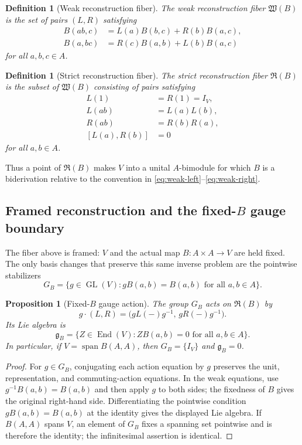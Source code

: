 \documentclass[11pt]{amsart}
\newtheorem{proposition}[theorem]{Proposition}
\newtheorem{definition}[theorem]{Definition}
\newcommand{\Span}{\operatorname{span}}
\newcommand{\Wfib}{\mathfrak W}
\newcommand{\Rfib}{\mathfrak R}
\begin{document}
\begin{definition}[Weak reconstruction fiber]
The weak reconstruction fiber $\Wfib(B)$ is the set of pairs $(L,R)$ satisfying
\begin{align}
B(ab,c)&=L(a)B(b,c)+R(b)B(a,c), \label{eq:weak-left}\\
B(a,bc)&=R(c)B(a,b)+L(b)B(a,c) \label{eq:weak-right}
\end{align}
for all $a,b,c\in A$.
\end{definition}

\begin{definition}[Strict reconstruction fiber]
The strict reconstruction fiber $\Rfib(B)$ is the subset of $\Wfib(B)$ consisting of pairs satisfying
\begin{align}
L(1)&=R(1)=I_V, \label{eq:unit}\\
L(ab)&=L(a)L(b), \label{eq:left-rep}\\
R(ab)&=R(b)R(a), \label{eq:right-rep}\\
[L(a),R(b)]&=0 \label{eq:commuting-actions}
\end{align}
for all $a,b\in A$.
\end{definition}

Thus a point of $\Rfib(B)$ makes $V$ into a unital $A$-bimodule for which $B$ is a biderivation relative to the convention in \eqref{eq:weak-left}--\eqref{eq:weak-right}.

\subsection{Framed reconstruction and the fixed-$B$ gauge boundary}\label{sec:gauge-boundary}
The fiber above is framed: $V$ and the actual map $B:A\times A\to V$ are held fixed.  The only basis changes that preserve this same inverse problem are the pointwise stabilizers
\[
G_B=\{g\in\operatorname{GL}(V):gB(a,b)=B(a,b)\text{ for all }a,b\in A\}.
\]

\begin{proposition}[Fixed-$B$ gauge action]\label{prop:fixed-B-gauge}
The group $G_B$ acts on $\Rfib(B)$ by
\[
g\cdot(L,R)=\bigl(gL(\mathord{-})g^{-1},\,gR(\mathord{-})g^{-1}\bigr).
\]
Its Lie algebra is
\[
\mathfrak g_B=\{Z\in\operatorname{End}(V):ZB(a,b)=0\text{ for all }a,b\in A\}.
\]
In particular, if $V=\Span B(A,A)$, then $G_B=\{I_V\}$ and $\mathfrak g_B=0$.
\end{proposition}

\begin{proof}
For $g\in G_B$, conjugating each action equation by $g$ preserves the unit, representation, and commuting-action equations.  In the weak equations, use $g^{-1}B(a,b)=B(a,b)$ and then apply $g$ to both sides; the fixedness of $B$ gives the original right-hand side.  Differentiating the pointwise condition $gB(a,b)=B(a,b)$ at the identity gives the displayed Lie algebra.  If $B(A,A)$ spans $V$, an element of $G_B$ fixes a spanning set pointwise and is therefore the identity; the infinitesimal assertion is identical.
\end{proof}
\end{document}
